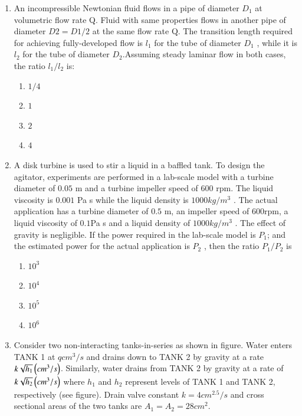 \documentclass[journal,12pt,onecolumn]{IEEEtran}
\theoremstyle{remark}
\begin{document}
\begin{enumerate}
    \item An incompressible Newtonian fluid flows in a pipe of diameter $D_1$ at volumetric flow rate Q. Fluid with same properties flows in another pipe of diameter $D2 = D1 / 2$ at the same flow rate Q. The transition length required for achieving fully-developed flow is $l_1$ for the tube of diameter $D_1$ , while it is $l_2$ for the tube of diameter $D_2$.Assuming steady laminar flow in both cases, the ratio $l_1/l_2$ is: 
    
     \hfill{}
    \begin{multicols}{4}
\begin{enumerate}
    \item $1/4$
    \item $1$
    \item $2$
    \item $4$
\end{enumerate}
\end{multicols}

    \item A disk turbine is used to stir a liquid in a baffled tank. To design the agitator, experiments are performed in a lab-scale model with a turbine diameter of $0.05$ m and a turbine impeller speed of $600$ rpm. The liquid viscosity is $0.001$ Pa s while the liquid density is $1000 kg/m^3$ . The actual application has a turbine diameter of $0.5$ m, an impeller speed of $600$rpm, a liquid viscosity of $0.1$Pa s and a liquid density of $1000 kg/m^3$ . The effect of gravity is negligible. If the power required in the lab-scale model is $P_1$; and the estimated power for the actual application is $P_2$ , then the ratio $P_1/P_2$ is 
    
     \hfill{}
\begin{multicols}{4}
    \begin{enumerate}
        \item $10^3$
        \item $10^4$
        \item $10^5$
        \item $10^6$
        \end{enumerate}
\end{multicols}
\newpage
    \item 
        Consider two non-interacting tanks-in-series as shown in figure. Water enters TANK 1 at $q cm^3/s$ and drains down to TANK 2 by gravity at a rate $k\sqrt{h_1}\left(cm^3/s\right)$. Similarly, water drains from TANK 2 by gravity at a rate of $k\sqrt{h_2}\left(cm^3/s\right)$ where $h_1$ and $h_2$ represent levels of TANK 1 and TANK 2, respectively (see figure). Drain valve constant $k = 4 cm^{2.5}/s$ and cross sectional areas of the two tanks are $A_1 = A_2 = 28 cm^2$.
     


\end{enumerate}
\end{document}
